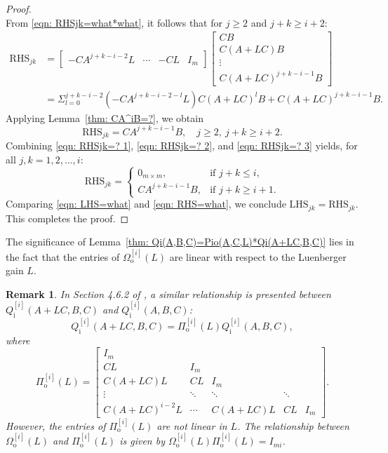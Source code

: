 \documentclass[sort&compress]{elsarticle}
\newtheorem{remark}{Remark}
\newcommand\Pio{\mathit\Omega_\mathrm o}
\newcommand\Qi{Q_\mathrm i}
\begin{document}
\begin{proof}
\begin{equation}
\end{equation}
From \eqref{eqn: RHSjk=what*what}, it follows that for $j \ge 2$ and $j+k \ge i+2$:
\begin{align*}
\mathrm{RHS}_{jk}
&= \begin{bmatrix}
-CA^{j+k-i-2}L & \cdots & -CL & I_m
\end{bmatrix}
\begin{bmatrix}
CB \\ C(A+LC)B \\ \vdots \\ C(A+LC)^{j+k-i-1}B
\end{bmatrix}\\
&= \Sigma_{l=0}^{j+k-i-2}(-CA^{j+k-i-2-l}L)C(A+LC)^lB
+ C(A+LC)^{j+k-i-1}B.
\end{align*}
Applying Lemma~\ref{thm: CA^iB=?}, we obtain
\begin{equation}\label{eqn: RHSjk=? 3}
\mathrm{RHS}_{jk} = CA^{j+k-i-1}B, \quad j \ge 2, \ j+k \ge i+2.
\end{equation}
Combining \eqref{eqn: RHSjk=? 1}, \eqref{eqn: RHSjk=? 2},
and \eqref{eqn: RHSjk=? 3} yields, for all $j,k=1,2,\dots,i$:
\begin{equation}\label{eqn: RHS=what}
\mathrm{RHS}_{jk}
= \begin{cases}
0_{m\times m}, & \text{if } j+k \le i,\\
CA^{j+k-i-1}B, & \text{if } j+k \ge i+1.
\end{cases}
\end{equation}
Comparing \eqref{eqn: LHS=what} and \eqref{eqn: RHS=what},
we conclude $\mathrm{LHS}_{jk} = \mathrm{RHS}_{jk}$.
This completes the proof.
\end{proof}

The significance of
Lemma~\ref{thm: Qi(A,B,C)=Pio(A,C,L)*Qi(A+LC,B,C)} lies in
the fact that the entries of $\Pio^{[i]}(L)$ are linear with
respect to the Luenberger gain $L$.

\begin{remark}
In Section 4.6.2 of \cite{Zhoubook}, a similar relationship
is presented between $\Qi^{[i]}(A+LC,B,C)$ and $\Qi^{[i]}(A,B,C)$:
\[
\Qi^{[i]}(A+LC,B,C) = \mathit\Pi_\mathrm o^{[i]}(L)\Qi^{[i]}(A,B,C),
\]
where
\[
\mathit\Pi_\mathrm o^{[i]}(L) = \begin{bmatrix}
I_m & & & & \\
CL & I_m & & & \\
C(A+LC)L & CL & I_m & & \\
\vdots & \ddots & \ddots & \ddots & \\
C(A+LC)^{i-2}L & \cdots & C(A+LC)L & CL & I_m
\end{bmatrix}.
\]
However, the entries of $\mathit\Pi_\mathrm o^{[i]}(L)$
are not linear in $L$.
The relationship between $\Pio^{[i]}(L)$
and $\mathit\Pi_\mathrm o^{[i]}(L)$
is given by
$\Pio^{[i]}(L)\mathit\Pi_\mathrm o^{[i]}(L) = I_{mi}$.
\end{remark}
\end{document}
